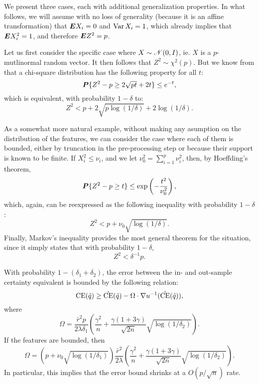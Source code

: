 We present three cases, each with additional generalization properties. In what follows,
we will assume with no loss of generality (because it is an affine transformation) that
$\bm E X_i=0$ and $\operatorname{Var} X_i = 1$, which already implies that $\bm E X_i^2=1$, and therefore
$\bm E Z^2=p$.


Let us first consider the specific case where $X\sim\mathscr{N}(0,I)$, ie. $X$ is a
$p$-mutlinormal random vector. It then follows that $Z^2\sim\chi^2(p)$. But we know from
\cite{laurent2000adaptive} that a chi-square distribution has the following property for
all $t$:
\[
\bm P\{Z^2-p \geq 2\sqrt{pt} + 2t\} \leq e^{-t},
\] 
which is equivalent, with probability $1-\delta$ to:
\[
  Z^2 < p + 2\sqrt{p\log(1/\delta)} + 2\log(1/\delta).
\]


As a somewhat more natural example, without making any asumption on the distribution of
the features, we can consider the case where each of them is bounded, either by truncation
in the pre-processing step or because their support is known to be finite. If
$X_i^2 \leq \nu_i$, and we let $\nu^2_0 = \sum_{i=1}^p \nu_i^2$, then, by Hoeffding's
theorem,
\[
  \bm P\{Z^2 - p\geq t\} \leq \exp\left(-\frac{t^2}{\nu_0^2}\right),
\]
which, again, can be reexpressed as the following inequality with probability $1-\delta$:
\[
  Z^2 < p + \nu_0\sqrt{\log(1/\delta)}.
\]
Finally, Markov's inequality provides the most general theorem for the situation, since it
simply states that with probability $1-\delta$, 
\[
  Z^2 < \delta^{-1}p.
\]
\begin{thm}
  With probability $1-(\delta_1+\delta_2)$, the error between the in- and out-sample certainty
  equivalent is bounded by the following relation:
  \[
    \operatorname{CE}(\hat q) \geq \hat{\operatorname{CE}}(\hat q) - \Omega\cdot\nabla u^{-1}(\hat{\operatorname{CE}}(\hat q)),
  \]
  where
  \[
    \Omega = \frac{\bar r^2p}{2\lambda\delta_1} \left(\frac{\gamma^2}{n} + \frac{\gamma(1+3\gamma)}{\sqrt{2n}}\sqrt{\log(1/\delta_2)}\right).
  \]
  If the features are bounded, then 
  \[
    \Omega = (p+\nu_0\sqrt{\log(1/\delta_1)})\frac{\bar r^2}{2\lambda} \left(\frac{\gamma^2}{n} + \frac{\gamma(1+3\gamma)}{\sqrt{2n}}\sqrt{\log(1/\delta_2)}\right).
  \]
In particular, this implies that the error bound shrinks at a $O(p/\sqrt{n})$ rate. 
\end{thm}

